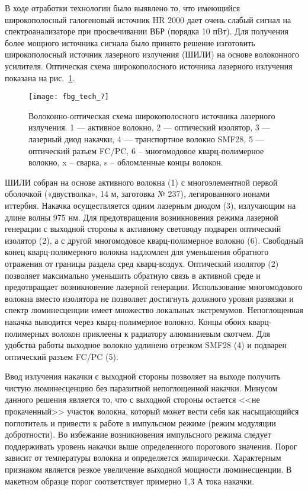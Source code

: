 В ходе отработки технологии было выявлено то, что имеющийся широкополосный галогеновый источник HR 2000 дает очень слабый сигнал на спектроанализаторе при просвечивании ВБР (порядка 10 пВт). Для получения более мощного источника сигнала было принято решение изготовить широкополосный источник лазерного излучения (ШИЛИ) на основе волоконного усилителя. Оптическая схема широкополосного источника лазерного излучения показана на рис.~\ref{img:fbg_tech_5}.

\begin{figure}
  \centering
  \texttt{[image: fbg\_tech\_7]}
  \caption{Волоконно-оптическая схема широкополосного источника лазерного излучения. 1 — активное волокно, 2 — оптический изолятор, 3 — лазерный диод накачки, 4 — транспортное волокно SMF28, 5 — оптический разъем FC/PC, 6 – многомодовое кварц-полимерное волокно, x – сварка, s – обломленные концы волокон.}
  \label{img:fbg_tech_5}
\end{figure}

ШИЛИ собран на основе активного волокна (1) с многоэлементной первой оболочкой («двустволка», 14 м, заготовка № 237), легированного ионами иттербия. Накачка осуществляется одним лазерным диодом (3), излучающим на длине волны 975 нм. Для предотвращения возникновения режима лазерной генерации с выходной стороны к активному световоду подварен оптический изолятор (2), а с другой многомодовое кварц-полимерное волокно (6). Свободный конец кварц-полимерного волокна надломлен для уменьшения обратного отражения от границы раздела сред кварц-воздух. Оптический изолятор (2) позволяет максимально уменьшить обратную связь в активной среде и предотвращает возникновение лазерной генерации. Использование многомодового волокна вместо изолятора не позволяет достигнуть должного уровня развязки и спектр люминесценции имеет множество локальных экстремумов. Непоглощенная накачка выводится через кварц-полимерное волокно. Концы обоих кварц-полимерных волокон приклеены к радиатору алюминиевым скотчем. Для удобства работы выходное волокно удлинено отрезком SMF28 (4) и подварен оптический разъем FC/PC (5).

Ввод излучения накачки с выходной стороны позволяет на выходе получить чистую люминесценцию без паразитной непоглощенной накачки. Минусом данного решения является то, что с выходной стороны остается <<не прокаченный>> участок волокна, который может вести себя как насыщающийся поглотитель и привести к работе в импульсном режиме (режим модуляции добротности). Во избежание возникновения импульсного режима следует поддерживать уровень накачки выше определенного порогового значения. Порог зависит от температуры волокна и определяется эмпирически. Характерным признаком является резкое увеличение выходной мощности люминесценции. В макетном образце порог соответствует примерно 1,3 А тока накачки.

